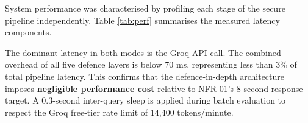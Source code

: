 System performance was characterised by profiling each stage of the secure pipeline independently. Table \ref{tab:perf} summarises the measured latency components.
\begin{table}[H]
\centering
\renewcommand{\arraystretch}{1.05}


\caption{Pipeline stage latency characterisation (secure mode, in-memory ChromaDB).}
\label{tab:perf}
\end{table}

The dominant latency in both modes is the Groq API call. The combined overhead of all five defence layers is below 70 ms, representing less than 3\% of total pipeline latency. This confirms that the defence-in-depth architecture imposes \textbf{negligible performance cost} relative to NFR-01's 8-second response target. A 0.3-second inter-query sleep is applied during batch evaluation to respect the Groq free-tier rate limit of 14,400 tokens/minute.


